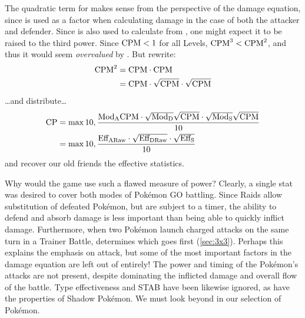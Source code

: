 The quadratic term for \CPM{} makes sense from the perspective of the damage
 equation, since \CPM{} is used as a factor when calculating damage in the
 case of both the attacker and defender.
Since \CPM{} is also used to calculate \MHP{} from , one might
 expect it to be raised to the third power.
Since $\mbox{CPM} < 1$ for all Levels, $\mbox{CPM}^3 < \mbox{CPM}^2$, and thus it would seem \textit{overvalued} by \CP\@.
But rewrite:
\begin{align}
  \mbox{CPM}^2 &= \mbox{CPM} \cdot \mbox{CPM}\\
  &= \mbox{CPM} \cdot \sqrt{\mbox{CPM}} \cdot \sqrt{\mbox{CPM}}
\end{align}
…and distribute…
\begin{align}
  \mbox{CP} &= \max{10, \frac{\mbox{$\text{Mod}_\text{A}$}\mbox{CPM}\cdot \sqrt{\mbox{$\text{Mod}_\text{D}$}}\sqrt{\mbox{CPM}} \cdot \sqrt{\mbox{$\text{Mod}_\text{S}$}}\sqrt{\mbox{CPM}}}{10}}\\
  &= \max{10, \frac{\mbox{$\text{Eff}_\text{ARaw}$} \cdot \sqrt{\mbox{$\text{Eff}_\text{DRaw}$}} \cdot \sqrt{\mbox{$\text{Eff}_\text{S}$}}}{10}}
\end{align}
and recover our old friends the effective statistics.

Why would the game use such a flawed measure of power?
Clearly, a single stat was desired to cover both modes of Pokémon GO battling.
Since Raids allow substitution of defeated Pokémon, but are subject to a timer,
  the ability to defend and absorb damage is less important than being able to
  quickly inflict damage.
Furthermore, when two Pokémon launch charged attacks on the same turn in a Trainer
  Battle,  determines which goes first (\autoref{sec:3x3}).
Perhaps this explains the emphasis on attack, but some of the most important
  factors in the damage equation are left out of \CP{} entirely!
The power and timing of the Pokémon's attacks are not present, despite
  dominating the inflicted damage and overall flow of the battle.
Type effectiveness and STAB have been likewise ignored, as have the
  properties of Shadow Pokémon.
We must look beyond \CP{} in our selection of Pokémon.

